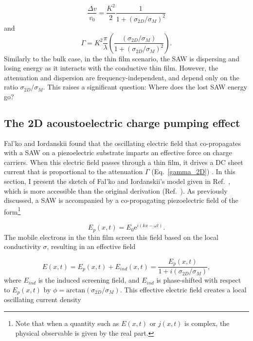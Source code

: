 \documentclass[double,12pt,1in,seploa]{beavtex}
\let\Oldsubsection\subsection
\renewcommand{\subsection}{\FloatBarrier\Oldsubsection}
\begin{document}
\begin{equation}
    \frac{\Delta v}{v_0} = \frac{K^2}{2}\frac{1}{1+(\sigma_{2D}/\sigma_M)^2} \label{v_2D}
\end{equation}
and
\begin{equation}
    \Gamma = K^2 \frac{\pi}{\lambda}\left(\frac{(\sigma_{2D}/\sigma_M)}{1+(\sigma_{2D}/\sigma_M)^2}\right). \label{gamma_2D}
\end{equation}
Similarly to the bulk case, in the thin film scenario, the SAW is dispersing and losing energy as it interacts with the conductive thin film. However, the attenuation and dispersion are frequency-independent, and depend only on the ratio $\sigma_{2D}/\sigma_M$. This raises a significant question: Where does the lost SAW energy go? 

\subsection{The 2D acoustoelectric charge pumping effect} \label{classical relaxtion model}

Fal'ko and Iordanskii found that the oscillating electric field that co-propagates with a SAW on a piezoelectric substrate imparts an effective force on charge carriers. When this electric field passes through a thin film, it drives a DC sheet current that is proportional to the attenuation $\Gamma$ (Eq.\ \ref{gamma_2D}) \cite{falko_acoustoelectric_1993}. In this section, I present the sketch of Fal'ko and Iordanskii's model given in Ref.\ \cite{esslinger_ultrasonic_1994}, which is more accessible than the original derivation (Ref.\ \cite{falko_acoustoelectric_1993}). As previously discussed, a SAW is accompanied by a co-propagating piezoelectric field of the form\footnote{Note that when a quantity such as $E(x,t)$ or $j(x,t)$ is complex, the physical observable is given by the real part.}

\begin{equation}
    E_p(x, t) = E_0 \mathrm{e}^{i(kx - \omega t)}. \label{SAW plane wave}
\end{equation}
The mobile electrons in the thin film screen this field based on the local conductivity $\sigma$, resulting in an effective field

\begin{equation}
    E(x,t) = E_p(x,t) + E_{ind}(x,t) = \frac{E_p(x,t)}{1+i(\sigma_{2D}/\sigma_M)}, \label{E eff}
\end{equation}
where $E_{ind}$ is the induced screening field, and $E_{ind}$ is phase-shifted with respect to $E_p(x,t)$ by $\phi = \mathrm{arctan}(\sigma_{2D}/\sigma_M)$.
This effective electric field creates a local oscillating current density
\end{document}
